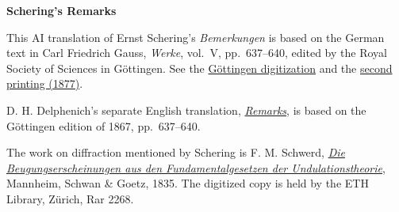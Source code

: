 \clearpage
{}
\begin{center}\textbf{Schering’s Remarks}\end{center}
\noindent This AI translation of Ernst Schering’s \textit{Bemerkungen} is based on the German text in Carl Friedrich Gauss, \textit{Werke}, vol.~V, pp.~637--640, edited by the Royal Society of Sciences in Göttingen. See the \href{https://gdz.sub.uni-goettingen.de/id/PPN236006339}{Göttingen digitization} and the \href{https://archive.org/download/Werkecarlf05gausrich/page/n648}{second printing (1877)}.
\par\smallskip\noindent D. H. Delphenich’s separate English translation, \href{https://neo-classical-physics.info/uploads/3/4/3/6/34363841/schering_-_remarks_on_gauss.pdf}{\textit{Remarks}}, is based on the Göttingen edition of 1867, pp.~637--640.
\par\smallskip\noindent The work on diffraction mentioned by Schering is F. M. Schwerd, \href{https://doi.org/10.3931/e-rara-16523}{\textit{Die Beugungserscheinungen aus den Fundamentalgesetzen der Undulationstheorie}}, Mannheim, Schwan \& Goetz, 1835. The digitized copy is held by the ETH Library, Zürich, Rar 2268.
\clearpage
